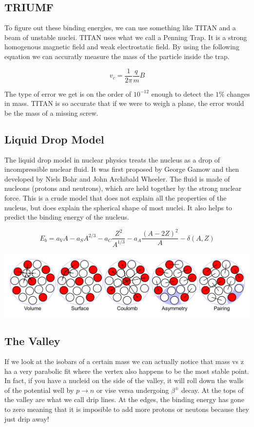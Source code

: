 \documentclass[english, 11pt]{article}
\begin{document}
      \subsection{TRIUMF}

      To figure out these binding energies, we can use something like TITAN and a beam of unstable nuclei. TITAN uses what we call a Penning Trap. It is a strong homogenous magnetic field and weak electrostatic field. By using the following equation we can accuratly measure the mass of the particle inside the trap.

      \[ v_c = \frac{1}{2\pi}\frac{q}{m}B\]

      The type of error we get is on the order of $10^{-12}$ enough to detect the $1\%$ changes in mass. TITAN is so accurate that if we were to weigh a plane, the error would be the mass of a missing screw.

      \subsection{Liquid Drop Model}
      The liquid drop model in nuclear physics treats the nucleus as a drop of incompressible nuclear fluid. It was first proposed by George Gamow and then developed by Niels Bohr and John Archibald Wheeler. The fluid is made of nucleons (protons and neutrons), which are held together by the strong nuclear force. This is a crude model that does not explain all the properties of the nucleus, but does explain the spherical shape of most nuclei. It also helps to predict the binding energy of the nucleus.
      \begin{defn}\label{ldm}
      \[ E_b = a_V A-a_S A^{2/3} - a_C \frac{Z^2}{A^{1/3}} - a_A \frac{(A-2Z)^2}{A} - \delta(A,Z) \]
      \end{defn}
      \begin{center}\label{rus}
         \includegraphics[scale=0.23]{../img/liquid}
      \end{center}

      \subsection{The Valley}
      If we look at the isobars of a certain mass we can actually notice that mass vs z ha a very parabolic fit where the vertex also happens to be the most stable point. In fact, if you have a nucleid on the side of the valley, it will roll down the walls of the potential well by $p \rightarrow n$ or vise versa undergoing $\beta^{\pm}$ decay. At the tops of the valley are what we call drip lines. At the edges, the binding energy has gone to zero meaning that it is imposible to add more protons or neutons because they just drip away!
\end{document}
